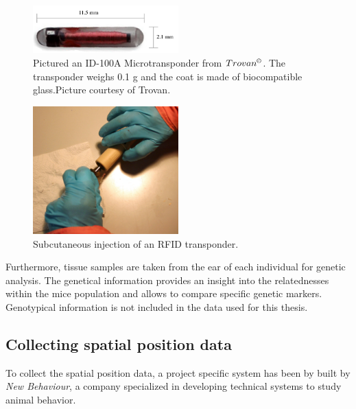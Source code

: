 \begin{figure}[htpb]
\begin{center}
		\includegraphics[width=0.5\textwidth]{assets/pdf/transponder.pdf}
  		\caption[Trovan ID-100A Microtransponder]{Pictured an ID-100A Microtransponder from $Trovan^{\copyright}$. The transponder weighs 0.1 g and the coat is made of biocompatible glass.\footnotesize Picture courtesy of Trovan.}
  		\label{fig:transponder}
\end{center}
\end{figure}
\begin{figure}[htpb]
\begin{center}
		\includegraphics[width=0.5\textwidth]{assets/pdf/transponder_inject.pdf}
  		\caption[Injecting an RFID transponder]{Subcutaneous injection of an RFID transponder.}
  		\label{fig:inject_rfid}
\end{center}
\end{figure}

Furthermore, tissue samples are taken from the ear of each individual for genetic analysis. The genetical information provides an insight into the relatednesses within the mice population and allows to compare specific genetic markers. Genotypical information is not included in the data used for this thesis.

\subsection{Collecting spatial position data}
\label{subsec:collectspatialpos}

To collect the spatial position data, a project specific system has been by built by \textit{New Behaviour}, a company specialized in developing technical systems to study animal behavior. 

